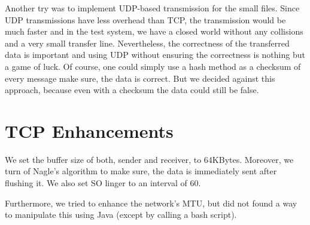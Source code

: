 \documentclass[12pt,a4paper]{article}
\begin{document}
Another try was to implement UDP-based transmission for the small files. Since UDP transmissions have less overhead than TCP, the transmission would be much faster and in the test system, we have a closed world without any collisions and a very small transfer line. Nevertheless, the correctness of the transferred data is important and using UDP without ensuring the correctness is nothing but a game of luck. Of course, one could simply use a hash method as a checksum of every message make sure, the data is correct. But we decided against this approach, because even with a checksum the data could still be false.

\section{TCP Enhancements}
We set the buffer size of both, sender and receiver, to 64KBytes. Moreover, we turn of Nagle's algorithm to make sure, the data is immediately sent after flushing it. We also set SO linger to an interval of 60.

Furthermore, we tried to enhance the network's MTU, but did not found a way to manipulate this using Java (except by calling a bash script).
\end{document}

